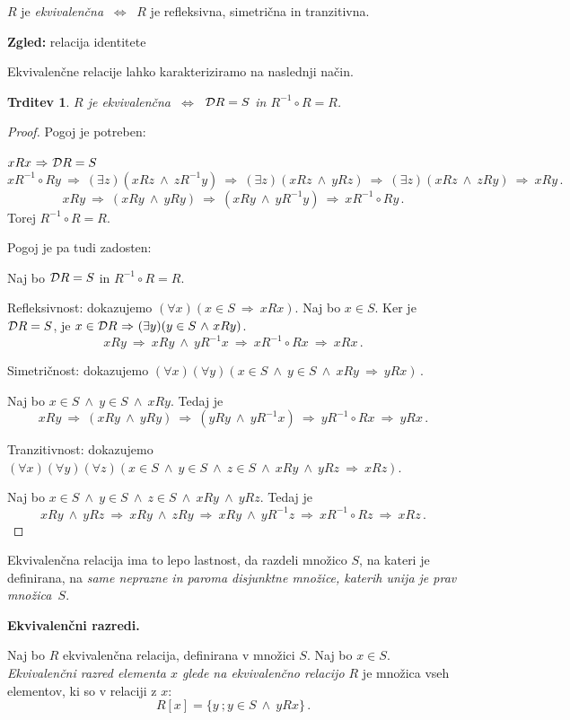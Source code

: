 \documentclass[11pt,paper=b5,footinclude,headinclude]{scrbook} %
\def\inn {{~\wedge~}}
\def\sledi {{~\Rightarrow~}}
\def\cee {{~\Leftrightarrow~}}
\newtheorem*{trditev}{Trditev}
\begin{document}
$R$ je {\em ekvivalenčna} $\cee$ $R$ je refleksivna, simetrična in tranzitivna.

\textbf{ Zgled:} relacija identitete

\bigskip
Ekvivalenčne relacije lahko karakteriziramo na naslednji način.

\begin{trditev}
$R$ je ekvivalenčna $\cee$ ${\cal D}R = S$ in $R^{-1}\circ R = R$.
\end{trditev}

\begin{proof}
Pogoj je potreben:

$xRx \sledi {\cal D}R = S$
$$xR^{-1}\circ Ry \sledi (\exists z)(xRz \inn zR^{-1}y)
\sledi (\exists z)(xRz \inn yRz)
\sledi (\exists z)(xRz \inn zRy)
\sledi xRy\,.$$
$$xRy
\sledi (xRy\inn yRy)
\sledi (xRy\inn yR^{-1}y)
\sledi xR^{-1}\circ Ry\,.$$
Torej $R^{-1}\circ R = R$.

Pogoj je pa tudi zadosten:

Naj bo ${\cal D}R = S$ in $R^{-1}\circ R = R$.

Refleksivnost: dokazujemo $(\forall x)(x\in S\sledi xRx)$.
Naj bo $x\in S$. Ker je ${\cal D}R = S$,
je $x\in {\cal D}R\sledi (\exists y)(y\in S\inn xRy)$.
$$xRy
\sledi xRy\inn yR^{-1}x
\sledi x R^{-1}\circ R x
\sledi xRx\,.$$

Simetričnost: dokazujemo $(\forall x)(\forall y)(x\in S\inn y\in S\inn xRy\sledi yRx)\,.$

Naj bo $x\in S\inn y\in S\inn xRy$.
Tedaj je
$$xRy \sledi (xRy\inn yRy)
\sledi (yRy\inn yR^{-1}x)
\sledi yR^{-1}\circ Rx
\sledi yRx\,.$$

Tranzitivnost: dokazujemo $(\forall x)(\forall y)(\forall z)(x\in S\inn y\in S\inn z\in S\inn xRy\inn yRz\sledi xRz).$

Naj bo $x\in S\inn y\in S\inn z\in S\inn xRy\inn yRz$.
Tedaj je
$$xRy \inn yRz \sledi xRy\inn zRy
\sledi xRy\inn yR^{-1}z
\sledi xR^{-1}\circ Rz
\sledi xRz\,.$$
\end{proof}

\medskip
Ekvivalenčna relacija ima to lepo lastnost, da razdeli množico $S$, na kateri je definirana, na {\em same neprazne in paroma disjunktne množice, katerih unija
je prav množica~$S$}.

\medskip
\textbf{ Ekvivalenčni razredi.}

Naj bo $R$ ekvivalenčna relacija, definirana v množici $S$. Naj bo $x\in S$. {\em Ekvivalenčni razred elementa $x$ glede na ekvivalenčno relacijo $R$} je množica vseh elementov, ki so v relaciji z $x$:
$$R[x] = \{y~;y\in S \inn yRx\}\,.$$
\end{document}
